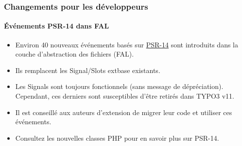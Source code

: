
\begin{frame}[fragile]
	\frametitle{Changements pour les développeurs}
	\framesubtitle{Événements PSR-14 dans FAL}

	\lstset{basicstyle=\tiny\ttfamily}

	\begin{itemize}
		\item Environ 40 nouveaux événements basés sur
			\href{https://www.php-fig.org/psr/psr-14/}{PSR-14}
			sont introduits dans la couche d'abstraction des fichiers (FAL).
		\item Ils remplacent les Signal/Slots extbase existants.
		\item Les Signals sont toujours fonctionnels (sans message de dépréciation).
			Cependant, ces derniers sont susceptibles d'être retirés dans TYPO3 v11.
		\item Il est conseillé aux auteurs d'extension de migrer leur code et utiliser ces événements.
		\item Consultez les nouvelles classes PHP pour en savoir plus sur PSR-14.
	\end{itemize}

\end{frame}



